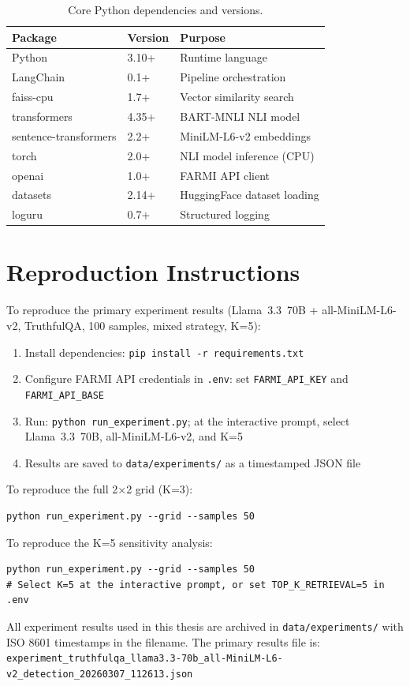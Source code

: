 \begin{table}[h]
\centering
\caption{Core Python dependencies and versions.}
\label{tab:app_deps}
\begin{tabular}{lll}
\hline
\textbf{Package} & \textbf{Version} & \textbf{Purpose} \\
\hline
Python         & 3.10+    & Runtime language \\
LangChain      & 0.1+     & Pipeline orchestration \\
faiss-cpu      & 1.7+     & Vector similarity search \\
transformers   & 4.35+    & BART-MNLI NLI model \\
sentence-transformers & 2.2+ & MiniLM-L6-v2 embeddings \\
torch          & 2.0+     & NLI model inference (CPU) \\
openai         & 1.0+     & FARMI API client \\
datasets       & 2.14+    & HuggingFace dataset loading \\
loguru         & 0.7+     & Structured logging \\
\hline
\end{tabular}
\end{table}

\section{Reproduction Instructions}

To reproduce the primary experiment results (Llama~3.3~70B + all-MiniLM-L6-v2, TruthfulQA, 100 samples, mixed strategy, K=5):

\begin{enumerate}
    \item Install dependencies: \texttt{pip install -r requirements.txt}
    \item Configure FARMI API credentials in \texttt{.env}: set \texttt{FARMI\_API\_KEY} and \texttt{FARMI\_API\_BASE}
    \item Run: \texttt{python run\_experiment.py}; at the interactive prompt, select Llama~3.3~70B, all-MiniLM-L6-v2, and K=5
    \item Results are saved to \texttt{data/experiments/} as a timestamped JSON file
\end{enumerate}

To reproduce the full 2×2 grid (K=3):

\begin{verbatim}
python run_experiment.py --grid --samples 50
\end{verbatim}

To reproduce the K=5 sensitivity analysis:

\begin{verbatim}
python run_experiment.py --grid --samples 50
# Select K=5 at the interactive prompt, or set TOP_K_RETRIEVAL=5 in .env
\end{verbatim}

All experiment results used in this thesis are archived in \texttt{data/experiments/} with ISO 8601 timestamps in the filename. The primary results file is:\\
\texttt{experiment\_truthfulqa\_llama3.3-70b\_all-MiniLM-L6-v2\_detection\_20260307\_112613.json}
